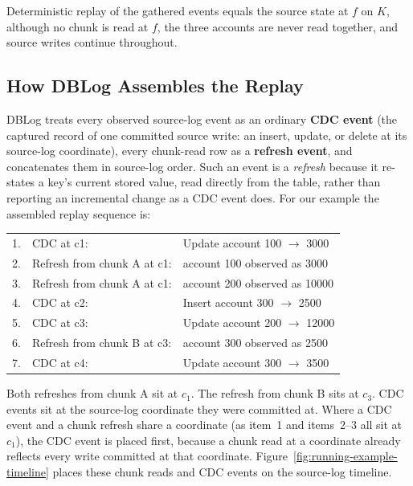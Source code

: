 \documentclass[letterpaper,10pt,twocolumn]{article}
\begin{document}
Deterministic replay of the gathered events equals the source state at
$f$ on $K$, although no chunk is read at $f$, the three accounts are
never read together, and source writes continue throughout.

\subsection{How DBLog Assembles the
Replay}\label{how-dblog-assembles-the-replay}

DBLog treats every observed source-log event as an ordinary
\textbf{CDC event} (the captured record of one committed source
write: an insert, update, or delete at its source-log coordinate),
every chunk-read row as a \textbf{refresh event}, and concatenates them
in source-log order. Such an event is a \emph{refresh} because it
re-states a key's current stored value, read directly from the table,
rather than reporting an incremental change as a CDC event does. For
our example the assembled replay sequence is:

\begin{center}\ttfamily\scriptsize
\begin{tabular}{@{}r@{\hskip 0.4em}l@{\hskip 1em}l@{}}
1. & CDC at c1:                  & Update account 100 $\to$ 3000\\
2. & Refresh from chunk A at c1: & account 100 observed as 3000\\
3. & Refresh from chunk A at c1: & account 200 observed as 10000\\
4. & CDC at c2:                  & Insert account 300 $\to$ 2500\\
5. & CDC at c3:                  & Update account 200 $\to$ 12000\\
6. & Refresh from chunk B at c3: & account 300 observed as 2500\\
7. & CDC at c4:                  & Update account 300 $\to$ 3500\\
\end{tabular}
\end{center}

Both refreshes from chunk A sit at $c_1$. The refresh from
chunk B sits at $c_3$. CDC events sit at the source-log
coordinate they were committed at. Where a CDC event and a chunk
refresh share a coordinate (as item~1 and items~2--3 all sit at
$c_1$), the CDC event is placed first, because a chunk read at a
coordinate already reflects every write committed at that coordinate.
Figure~\ref{fig:running-example-timeline}
places these chunk reads and CDC events on the source-log timeline.
\end{document}
